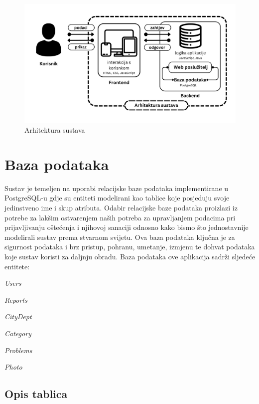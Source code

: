 \begin{figure}[H]
	\includegraphics[scale=0.20]{slike/Arhitektura_sustava.png} %
	\centering
	\caption{Arhitektura sustava}
	\label{fig:Arhitektura}
\end{figure}


\section{Baza podataka}

\noindent Sustav je temeljen na uporabi relacijske baze podataka implementirane u PostgreSQL-u gdje su entiteti modelirani kao tablice koje posjeduju svoje jedinstveno ime i skup atributa.
Odabir relacijske baze podataka proizlazi iz potrebe za lakšim ostvarenjem naših potreba za upravljanjem podacima pri prijavljivanju oštećenja i njihovoj sanaciji
odnosno kako bismo što jednostavnije modelirali sustav prema stvarnom svijetu.
Ova baza podataka ključna je za sigurnost podataka i brz pristup, pohranu, umetanje, izmjenu te dohvat podataka koje sustav koristi za daljnju obradu.
Baza podataka ove aplikacija sadrži sljedeće entitete:
\begin{packed_item}
	\item \textit{Users}
	\item \textit{Reports}
	\item \textit{CityDept}
	\item \textit{Category}
	\item \textit{Problems}
	\item \textit{Photo}
\end{packed_item}



\subsection{Opis tablica}

